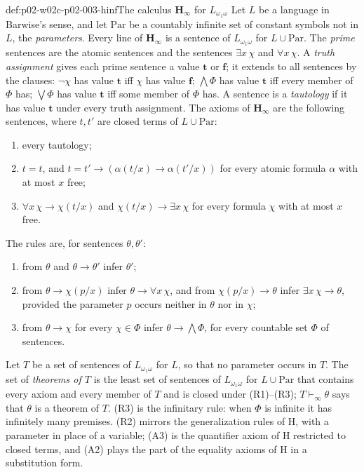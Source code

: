 \begin{hbdefinition}{def:p02-w02c-p02-003-hinf}{The calculus \(\mathbf H_{\infty}\) for \(L_{\omega_1\omega}\)}
Let \(L\) be a language in Barwise's sense, and let \(\mathrm{Par}\) be a
countably infinite set of constant symbols not in \(L\), the
\emph{parameters}.  Every line of \(\mathbf H_{\infty}\) is a sentence of
\(L_{\omega_1\omega}\) for \(L\cup\mathrm{Par}\).  The \emph{prime}
sentences are the atomic sentences and the sentences \(\exists x\,\chi\)
and \(\forall x\,\chi\).  A \emph{truth assignment} gives each prime
sentence a value \(\mathbf t\) or \(\mathbf f\); it extends to all
sentences by the clauses: \(\neg\chi\) has value \(\mathbf t\) iff
\(\chi\) has value \(\mathbf f\); \(\bigwedge\Phi\) has value \(\mathbf t\)
iff every member of \(\Phi\) has; \(\bigvee\Phi\) has value \(\mathbf t\)
iff some member of \(\Phi\) has.  A sentence is a \emph{tautology} if it
has value \(\mathbf t\) under every truth assignment.  The axioms of
\(\mathbf H_{\infty}\) are the following sentences, where \(t,t'\) are
closed terms of \(L\cup\mathrm{Par}\):
\begin{enumerate}
\item[(A1)] every tautology;
\item[(A2)] \(t=t\), and \(t=t'\to(\alpha(t/x)\to\alpha(t'/x))\) for every
      atomic formula \(\alpha\) with at most \(x\) free;
\item[(A3)] \(\forall x\,\chi\to\chi(t/x)\) and
      \(\chi(t/x)\to\exists x\,\chi\) for every formula \(\chi\) with at
      most \(x\) free.
\end{enumerate}
The rules are, for sentences \(\theta,\theta'\):
\begin{enumerate}
\item[(R1)] from \(\theta\) and \(\theta\to\theta'\) infer \(\theta'\);
\item[(R2)] from \(\theta\to\chi(p/x)\) infer \(\theta\to\forall x\,\chi\),
      and from \(\chi(p/x)\to\theta\) infer \(\exists x\,\chi\to\theta\),
      provided the parameter \(p\) occurs neither in \(\theta\) nor in
      \(\chi\);
\item[(R3)] from \(\theta\to\chi\) for every \(\chi\in\Phi\) infer
      \(\theta\to\bigwedge\Phi\), for every countable set \(\Phi\) of
      sentences.
\end{enumerate}
Let \(T\) be a set of sentences of \(L_{\omega_1\omega}\) for \(L\), so that
no parameter occurs in \(T\).  The set of \emph{theorems of \(T\)} is the
least set of sentences of \(L_{\omega_1\omega}\) for \(L\cup\mathrm{Par}\)
that contains every axiom and every member of \(T\) and is closed under
(R1)--(R3); \(T\vdash_{\infty}\theta\) says that \(\theta\) is a theorem of
\(T\).  (R3) is the infinitary rule: when \(\Phi\) is infinite it has
infinitely many premises.  (R2) mirrors the generalization rules of H,
with a parameter in place of a variable; (A3) is the quantifier axiom of H
restricted to closed terms, and (A2) plays the part of the equality axioms
of H in a substitution form.
\end{hbdefinition}

